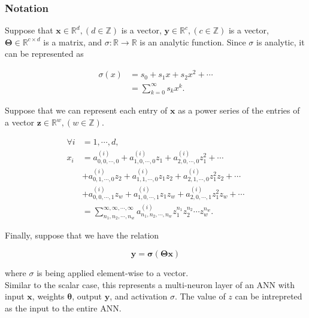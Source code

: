 \subsubsection{Notation}

Suppose that $\mathbf{x} \in \mathbb{R}^d, (d \in \mathbb{Z})$ is a vector, $\mathbf{y} \in \mathbb{R}^c, (c \in \mathbb{Z})$ is a vector, $\mathbf{\Theta} \in \mathbb{R}^{c \times d}$ is a matrix, and $\sigma: \mathbb{R} \to \mathbb{R}$ is an analytic function. Since $\sigma$ is analytic, it can be represented as

\begin{align}
    \sigma(x)
    &= s_0 + s_1 x + s_2 x^2 + \cdots \nonumber \\
    &= \sum_{k=0}^{\infty} s_{k} x^{k}.
    \label{eqn:vector layer activation}
\end{align}

Suppose that we can represent each entry of $\mathbf{x}$ as a power series of the entries of a vector $\mathbf{z} \in \mathbb{R}^{w}, (w \in \mathbb{Z})$.

\begin{align}
    \forall i &= 1, \cdots, d, \nonumber \\ x_i
    &= a^{(i)}_{0,0,\cdots,0} + a^{(i)}_{1,0,\cdots,0} z_1 + a^{(i)}_{2,0,\cdots,0} z_1^2 + \cdots \nonumber \\
    &+ a^{(i)}_{0,1,\cdots,0} z_2 + a^{(i)}_{1,1,\cdots,0} z_1 z_2 + a^{(i)}_{2,1,\cdots,0} z_1^2 z_2 + \cdots \nonumber \\
    &+ a^{(i)}_{0,0,\cdots,1} z_w + a^{(i)}_{1,0,\cdots,1} z_1 z_w + a^{(i)}_{2,0,\cdots,1} z_1^2 z_w + \cdots \nonumber \\
    &= \sum_{n_1,n_2,\cdots,n_w}^{\infty,\infty,\cdots,\infty} a^{(i)}_{n_1,n_2,\cdots,n_w} z_1^{n_1} z_2^{n_2} \cdots z_w^{n_w}.
    \label{eqn:vector x series}
\end{align}

Finally, suppose that we have the relation

\begin{equation}
    \mathbf{y} = \mathbf{\sigma}(\mathbf{\Theta} \mathbf{x})
    \label{eqn:vector layer relation}
\end{equation}

where $\sigma$ is being applied element-wise to a vector.\\

Similar to the scalar case, this represents a multi-neuron layer of an ANN with input $\mathbf{x}$, weights $\mathbf{\theta}$, output $\mathbf{y}$, and activation $\sigma$. The value of $z$ can be intrepreted as the input to the entire ANN.

